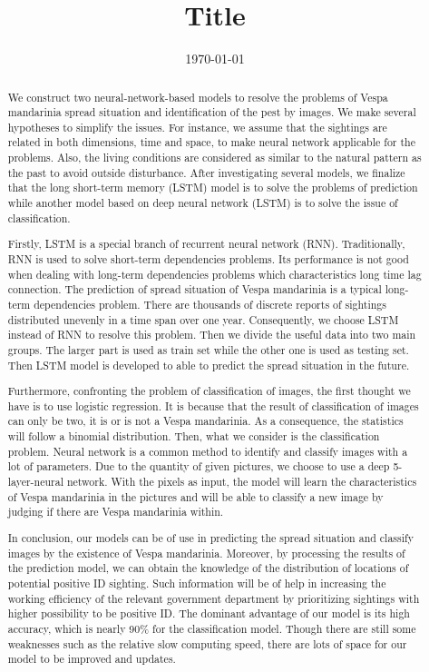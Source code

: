 \documentclass{mcmthesis}
\begin{document}
\linespread{0.6}
\setlength{\parskip}{0.5\baselineskip}
\title{Title}

\date{\today}
\begin{abstract}

We construct two neural-network-based models to resolve the problems of Vespa mandarinia spread situation and identification of the pest by images. We make several hypotheses to simplify the issues. For instance, we assume that the sightings are related in both dimensions, time and space, to make neural network applicable for the problems. Also, the living conditions are considered as similar to the natural pattern as the past to avoid outside disturbance. After investigating several models, we finalize that the long short-term memory (LSTM) model is to solve the problems of prediction while another model based on deep neural network (LSTM) is to solve the issue of classification.

Firstly, LSTM is a special branch of recurrent neural network (RNN). Traditionally, RNN is used to solve short-term dependencies problems. Its performance is not good when dealing with long-term dependencies problems which characteristics long time lag connection. The prediction of spread situation of Vespa mandarinia is a typical long-term dependencies problem. There are thousands of discrete reports of sightings distributed unevenly in a time span over one year. Consequently, we choose LSTM instead of RNN to resolve this problem. Then we divide the useful data into two main groups. The larger part is used as train set while the other one is used as testing set. Then LSTM model is developed to able to predict the spread situation in the future.

Furthermore, confronting the problem of classification of images, the first thought we have is to use logistic regression. It is because that the result of classification of images can only be two, it is or is not a Vespa mandarinia. As a consequence, the statistics will follow a binomial distribution. Then, what we consider is the classification problem. Neural network is a common method to identify and classify images with a lot of parameters. Due to the quantity of given pictures, we choose to use a deep 5-layer-neural network. With the pixels as input, the model will learn the characteristics of Vespa mandarinia in the pictures and will be able to classify a new image by judging if there are Vespa mandarinia within.

In conclusion, our models can be of use in predicting the spread situation and classify images by the existence of Vespa mandarinia. Moreover, by processing the results of the prediction model, we can obtain the knowledge of the distribution of locations of potential positive ID sighting. Such information will be of help in increasing the working efficiency of the relevant government department by prioritizing sightings with higher possibility to be positive ID. The dominant advantage of our model is its high accuracy, which is nearly 90\% for the classification model. Though there are still some weaknesses such as the relative slow computing speed, there are lots of space for our model to be improved and updates. 


\end{abstract}
\end{document}
